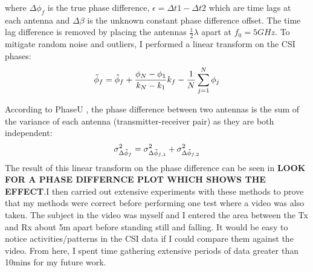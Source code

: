 where $\Delta\phi_{f}$ is the true phase difference, $\epsilon = \Delta t1 - \Delta t2$ which are time lags at each antenna and $\Delta\beta$ is the unknown constant phase difference offset. The time lag difference is removed by placing the antennas $\frac{1}{2}\lambda$ apart at $f_{0} = 5GHz$. To mitigate random noise and outliers, I performed a linear transform on the CSI phases: 
\vspace{-11pt}
\begin{equation}\label{eqn:3.5}
    \Tilde{\phi}_f = \hat{\phi}_{f}+\frac{\phi_{N}-\phi_{1}}{k_{N}-k_1}k_{f}-\frac{1}{N}\sum_{j=1}^{N} \phi_{j}
    \vspace{-11pt}
\end{equation} \par 
According to PhaseU \citep{PhaseU}, the phase difference between two antennas is the sum of the variance of each antenna (transmitter-receiver pair) as they are both independent:
\vspace{-11pt}
\begin{equation}\label{eqn:3.6}
    \sigma^{2}_{\Delta\Tilde{\phi}_f} = \sigma^{2}_{\Delta\Tilde{\phi}_{f,1}} + \sigma^{2}_{\Delta\Tilde{\phi}_{f,2}}
    \vspace{-11pt}
\end{equation} 
The result of this linear transform on the phase difference can be seen in \textbf{LOOK FOR A PHASE DIFFERNCE PLOT WHICH SHOWS THE EFFECT}.I then carried out extensive experiments with these methods to prove that my methods were correct before performing one test where a video was also taken. The subject in the video was myself and I entered the area between the Tx and Rx about 5m apart before standing still and falling. It would be easy to notice activities/patterns in the CSI data if I could compare them against the video. From here, I spent time gathering extensive periods of data greater than 10mins for my future work.

